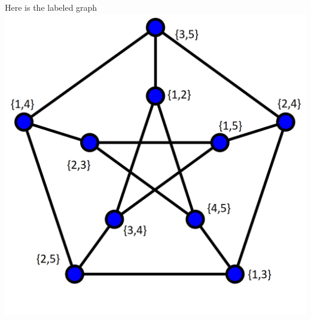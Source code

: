 \documentclass[12pt]{article}
\begin{document}
\begin{enumerate}
\begin{enumerate}
\begin{center}
Here is the labeled graph\\
\includegraphics[scale=.25]{petersen-labeled.png}
\end{center}
\end{enumerate}


\medskip


\end{enumerate}
\end{document}
